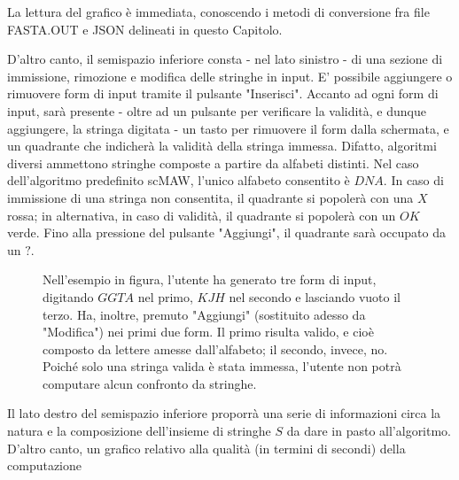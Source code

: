 La lettura del grafico è immediata, conoscendo i metodi di conversione fra file FASTA.OUT e JSON delineati in questo Capitolo.

\vspace{3mm}

D'altro canto, il semispazio inferiore consta - nel lato sinistro -  di una sezione di immissione, rimozione e modifica delle stringhe in input. E' possibile aggiungere o rimuovere form di input tramite il pulsante "Inserisci". Accanto ad ogni form di input, sarà presente - oltre ad un pulsante per verificare la validità, e dunque aggiungere, la stringa digitata - un tasto per rimuovere il form dalla schermata, e un quadrante che indicherà la validità della stringa immessa. Difatto, algoritmi diversi ammettono stringhe composte a partire da alfabeti distinti. Nel caso dell'algoritmo predefinito scMAW, l'unico alfabeto consentito è $DNA$. In caso di immissione di una stringa non consentita, il quadrante si popolerà con una $X$ rossa; in alternativa, in caso di validità, il quadrante si popolerà con un $OK$ verde. Fino alla pressione del pulsante "Aggiungi", il quadrante sarà occupato da un $?$.

\begin{figure}[ht!]
    \centering
    \caption{Nell'esempio in figura, l'utente ha generato tre form di input, digitando $GGTA$ nel primo, $KJH$ nel secondo e lasciando vuoto il terzo. Ha, inoltre, premuto "Aggiungi" (sostituito adesso da "Modifica") nei primi due form. Il primo risulta valido, e cioè composto da lettere amesse dall'alfabeto; il secondo, invece, no. Poiché solo una stringa valida è stata immessa, l'utente non potrà computare alcun confronto da stringhe.}
    \label{fig:esempio}
\end{figure}

\vspace{3mm}

Il lato destro del semispazio inferiore proporrà una serie di informazioni circa la natura e la composizione dell'insieme di stringhe $S$ da dare in pasto all'algoritmo. D'altro canto, un grafico relativo alla qualità (in termini di secondi) della computazione


